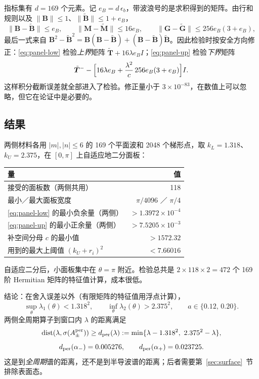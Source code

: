 \documentclass[11pt,a4paper,fontset=fandol]{ctexart}
\begin{document}
指标集有 $d=169$ 个元素。记 $e_B=d\,\epsilon_b$，带波浪号的是求积得到的矩阵。由行和规则以及 $\|\bm B\|\le1$、$\|\tilde{\bm B}\|\le1+e_B$，
\[
\|\bm B-\tilde{\bm B}\|\le e_B,\qquad \|\bm M-\tilde{\bm M}\|\le16e_B,\qquad
\|\bm G-\tilde{\bm G}\|\le256e_B(3+e_B),
\]
最后一式来自 $\bm B^2-\tilde{\bm B}^2=\bm B(\bm B-\tilde{\bm B})+(\bm B-\tilde{\bm B})\tilde{\bm B}$。因此检验时按安全方向修正：\eqref{eq:panel-low} 检验\emph{上界}矩阵 $\tilde{\bm T}+16\lambda e_BI$；\eqref{eq:panel-up} 检验\emph{下界}矩阵
\[
\tilde{\bm T}^--\Bigl[16\lambda e_B+\frac{\lambda^2}{c}\,256e_B(3+e_B)\Bigr]I .
\]
这样积分截断误差就全部进入了检验。修正量小于 $3\times10^{-83}$，在数值上可以忽略，但它在论证中是必要的。

\subsection{结果}

两侧材料各用 $|m|,|n|\le6$ 的 169 个平面波和 2048 个梯形点，取 $k_L=1.318$、$k_U=2.375$，在 $[0,\pi]$ 上自适应地二分面板：
\begin{center}
\small
\begin{tabular}{lr}
\toprule
量 & 值 \\
\midrule
接受的面板数（两侧共用） & 118 \\
最小／最大面板宽度 & $\pi/4096$ ／ $\pi/4$ \\
\eqref{eq:panel-low} 的最小负余量（两侧） & $>1.3972\times10^{-4}$ \\
\eqref{eq:panel-up} 的最小正余量（两侧） & $>7.5205\times10^{-3}$ \\
补空间分母 $c$ 的最小值 & $>1572.32$ \\
用到的最大上阈值 $(k_U+r_i)^2$ & $<7.66016$ \\
\bottomrule
\end{tabular}
\end{center}
自适应二分后，小面板集中在 $\theta=\pi$ 附近。检验总共是 $2\times118\times2=472$ 个 169 阶 Hermitian 矩阵的特征值计算，成本很低。

结论：在舍入误差以外（有限矩阵的特征值用浮点计算），
\begin{equation}
\label{eq:band-result}
\sup_\theta\lambda_{1}(\theta)<1.318^2,\qquad \inf_\theta\lambda_{2}(\theta)>2.375^2,\qquad a\in\{0.12,\,0.20\}.
\end{equation}
两侧全周期算子到窗口内 $\lambda$ 的距离满足
\begin{equation}
\label{eq:dper}
\operatorname{dist}(\lambda,\sigma(A^{\rm per}_\pm))\ge d_{\rm per}(\lambda):=\min\{\lambda-1.318^2,\ 2.375^2-\lambda\},
\end{equation}
\[
d_{\rm per}(\alpha_-)=0.005276,\qquad d_{\rm per}(\alpha_+)=0.023725 .
\]
这是到\emph{全周期}谱的距离，还不是到半导波谱的距离；后者需要第~\ref{sec:surface}~节排除表面态。
\end{document}
